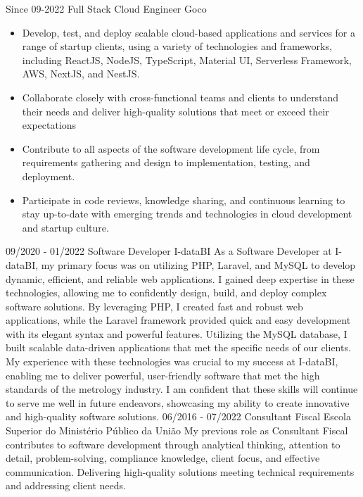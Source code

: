 \documentclass[letterpaper]{twentyonesecondcv} %
\begin{document}
{    \begin{twenty}
      \twentyitem
        {Since 09-2022}
        {Full Stack Cloud Engineer}
        {Goco}
        {\begin{itemize}
  \item Develop, test, and deploy scalable cloud-based applications and services for a range of startup clients, using a variety of technologies and frameworks, including ReactJS, NodeJS, TypeScript, Material UI, Serverless Framework, AWS, NextJS, and NestJS.
  \item Collaborate closely with cross-functional teams and clients to understand their needs and deliver high-quality solutions that meet or exceed their expectations
  \item Contribute to all aspects of the software development life cycle, from requirements gathering and design to implementation, testing, and deployment.
  \item Participate in code reviews, knowledge sharing, and continuous learning to stay up-to-date with emerging trends and technologies in cloud development and startup culture.
\end{itemize}}
      \twentyitem
        {09/2020 - 01/2022}
        {Software Developer}
        {I-dataBI}
        {\newline As a Software Developer at I-dataBI, my primary focus was on utilizing PHP, Laravel, and MySQL to develop dynamic, efficient, and reliable web applications. I gained deep expertise in these technologies, allowing me to confidently design, build, and deploy complex software solutions. By leveraging PHP, I created fast and robust web applications, while the Laravel framework provided quick and easy development with its elegant syntax and powerful features. Utilizing the MySQL database, I built scalable data-driven applications that met the specific needs of our clients. My experience with these technologies was crucial to my success at I-dataBI, enabling me to deliver powerful, user-friendly software that met the high standards of the metrology industry. I am confident that these skills will continue to serve me well in future endeavors, showcasing my ability to create innovative and high-quality software solutions.}
    \twentyitem
        {06/2016 - 07/2022}
        {Consultant Fiscal}
        {Escola Superior do Ministério Público da União}
        {\newline My previous role as Consultant Fiscal contributes to software development through analytical thinking, attention to detail, problem-solving, compliance knowledge, client focus, and effective communication. Delivering high-quality solutions meeting technical requirements and addressing client needs.}
    \end{twenty}
    }
\end{document}
